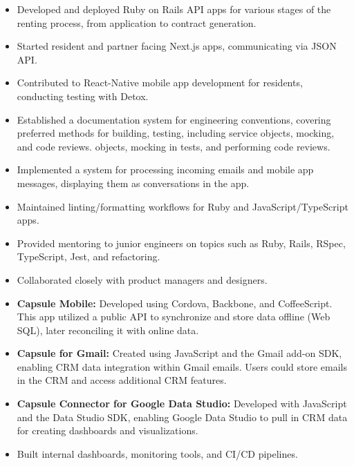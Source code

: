 \begin{itemize}
  \item Developed and deployed Ruby on Rails API apps for various stages of the
    renting process, from application to contract generation.
  \item Started resident and partner facing Next.js apps, communicating via
    JSON API.
  \item Contributed to React-Native mobile app development for residents,
    conducting testing with Detox.
  \item Established a documentation system for engineering conventions, covering
    preferred methods for building, testing, including service objects, mocking,
    and code reviews.
    objects, mocking in tests, and performing code reviews.
  \item Implemented a system for processing incoming emails and mobile app
    messages, displaying them as conversations in the app.
  \item Maintained linting/formatting workflows for Ruby and
    JavaScript/TypeScript apps.
  \item Provided mentoring to junior engineers on topics such as Ruby, Rails,
    RSpec, TypeScript, Jest, and refactoring.
  \item Collaborated closely with product managers and designers.
\end{itemize}

\begin{itemize}
  \item \textbf{Capsule Mobile:} Developed using Cordova, Backbone, and
    CoffeeScript. This app utilized a public API to synchronize and store data
    offline (Web SQL), later reconciling it with online data.
  \item \textbf{Capsule for Gmail:} Created using JavaScript and the Gmail
    add-on SDK, enabling CRM data integration within Gmail emails. Users could
    store emails in the CRM and access additional CRM features.
  \item \textbf{Capsule Connector for Google Data Studio:} Developed with
    JavaScript and the Data Studio SDK, enabling Google Data Studio to pull in
    CRM data for creating dashboards and visualizations.
  \item Built internal dashboards, monitoring tools, and CI/CD pipelines.
\end{itemize}

